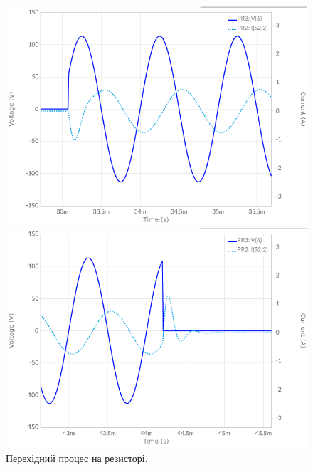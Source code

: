 \documentclass{article}
\begin{document}
\begin{normalsize}
	\begin{figure}[H]
		\begin{minipage}[t]{0.45\textwidth}
			\centering
			\includegraphics[width=\textwidth]{11}
		\end{minipage}
		\hfill
		\begin{minipage}[t]{0.45\textwidth}
			\centering
			\includegraphics[width=\textwidth]{12}
		\end{minipage}
		\caption{Перехідний процес на резисторі.}
	\end{figure}
	

\end{normalsize}
\end{document}
